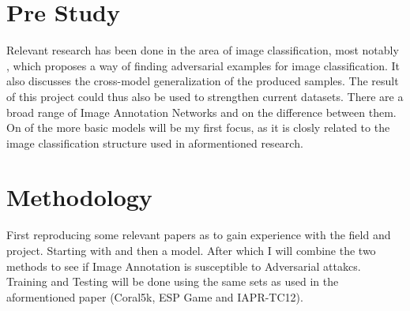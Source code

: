 \documentclass[12pt]{extarticle}
\begin{document}
\section{Pre Study}
Relevant research has been done in the area of image classification, most notably \cite[Intriguing properties of neural networks]{szegedy2014intriguing}, which proposes a way of finding adversarial examples for image classification. It also discusses the cross-model generalization of the produced samples. The result of this project could thus also be used to strengthen current datasets.
There are a broad range of Image Annotation Networks and \cite[surveys]{cheng_zhang_fu_tu_li_2018} on the difference between them. On of the more basic \cite[deep learning image annotation]{venkatesh} models will be my first focus, as it is closly related to the image classification structure used in aformentioned research.

\section{Methodology}
First reproducing some relevant papers as to gain experience with the field and project. Starting with \cite[Intriguing properties of neural networks]{szegedy2014intriguing} and then a \cite[deep learning image annotation]{venkatesh} model. After which I will combine the two methods to see if Image Annotation is susceptible to Adversarial attakcs.
Training and Testing will be done using the same sets as used in the aformentioned paper (Coral5k, ESP Game and  IAPR-TC12).
\end{document}
